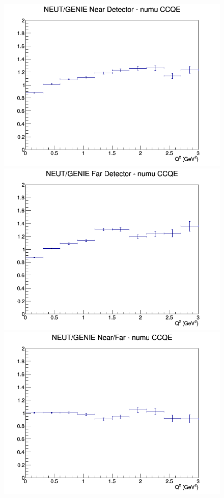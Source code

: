\documentclass[12pt]{article}
\begin{document}
\begin{figure}[h]
\includegraphics[width=\linewidth]{Q2/nominal/ratios/CCQE_NEUT_GENIE_numu_near_Q2.png}
\endminipage
{}
\includegraphics[width=\linewidth]{Q2/nominal/ratios/CCQE_NEUT_GENIE_numu_far_Q2.png}
\endminipage
{}
\includegraphics[width=\linewidth]{Q2/nominal/ratios/CCQE_NEUT_GENIE_numu_NF_Q2.png}

\end{figure}
\end{document}
